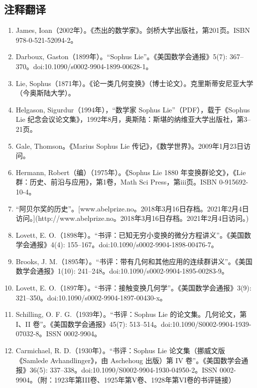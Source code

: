 \subsection{注释翻译}
\begin{enumerate}
\item James, Ioan（2002年）。《杰出的数学家》。剑桥大学出版社，第201页。ISBN 978-0-521-52094-2。
\item Darboux, Gaston（1899年）。“Sophus Lie”。《美国数学会通报》5(7): 367–370。doi:10.1090/s0002-9904-1899-00628-1。
\item Lie, Sophus（1871年）。《论一类几何变换》（博士论文）。克里斯蒂安尼亚大学（今奥斯陆大学）。
\item Helgason, Sigurdur（1994年），“数学家 Sophus Lie”（PDF），载于《Sophus Lie 纪念会议论文集》，1992年8月，奥斯陆：斯堪的纳维亚大学出版社，第3–21页。
\item Gale, Thomson。《Marius Sophus Lie 传记》，《数学世界》。2009年1月23日访问。
\item Hermann, Robert（编）（1975年）。《Sophus Lie 1880 年变换群论文》，《Lie 群：历史、前沿与应用》，第1卷，Math Sci Press，第iii页。ISBN 0-915692-10-4。
\item “阿贝尔奖的历史”。[www.abelprize.no。2018年3月16日存档。2021年2月4日访问。](http://www.abelprize.no。2018年3月16日存档。2021年2月4日访问。)
\item Lovett, E. O.（1898年）。“书评：已知无穷小变换的微分方程讲义”。《美国数学会通报》4(4): 155–167。doi:10.1090/s0002-9904-1898-00476-7。
\item Brooks, J. M.（1895年）。“书评：带有几何和其他应用的连续群讲义”。《美国数学会通报》1(10): 241–248。doi:10.1090/s0002-9904-1895-00283-9。
\item Lovett, E. O.（1897年）。“书评：接触变换几何学”。《美国数学会通报》3(9): 321–350。doi:10.1090/s0002-9904-1897-00430-x。
\item Schilling, O. F. G.（1939年）。“书评：Sophus Lie 的论文集。几何论文，第 I、II 卷”。《美国数学会通报》45(7): 513–514。doi:10.1090/S0002-9904-1939-07032-8。ISSN 0002-9904。
\item Carmichael, R. D.（1930年）。“书评：Sophus Lie 论文集（挪威文版《Samlede Avhandlinger》，由 Aschehoug 出版）第 IV 卷”。《美国数学会通报》36(5): 337–338。doi:10.1090/S0002-9904-1930-04950-2。ISSN 0002-9904。（附：1923年第III卷、1925年第V卷、1928年第VI卷的书评链接）
\end{enumerate}
